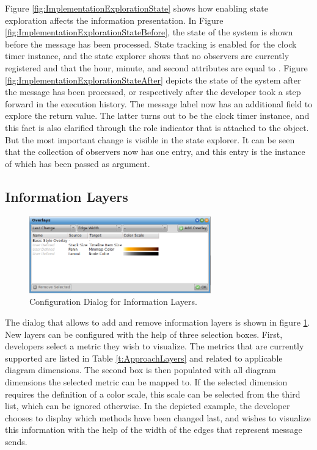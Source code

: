 Figure \ref{fig:ImplementationExplorationState} shows how enabling state exploration affects the information presentation.
In Figure \ref{fig:ImplementationExplorationStateBefore}, the state of the system is shown before the  message has been processed.
State tracking is enabled for the clock timer instance, and the state explorer shows that no observers are currently registered and that the hour, minute, and second attributes are equal to .
Figure \ref{fig:ImplementationExplorationStateAfter} depicts the state of the system after the  message has been processed, or respectively after the developer took a step forward in the execution history.
The message label now has an additional field to explore the return value.
The latter turns out to be the clock timer instance, and this fact is also clarified through the role indicator that is attached to the object.
But the most important change is visible in the state explorer.
It can be seen that the collection of observers now has one entry, and this entry is the instance of  which has been passed as argument.

\subsection{Information Layers}

\begin{figure}[tb]
	\centering
	\includegraphics[width=0.7\textwidth]{../images/04-ImplOverlays}
	\caption{Configuration Dialog for Information Layers.}
	\label{fig:ImplementationLayers}
\end{figure}

The dialog that allows to add and remove information layers is shown in figure \ref{fig:ImplementationLayers}.
New layers can be configured with the help of three selection boxes.
First, developers select a metric they wish to visualize. 
The metrics that are currently supported are listed in Table \ref{t:ApproachLayers}  and related to applicable diagram dimensions.
The second box is then populated with all diagram dimensions the selected metric can be mapped to.
If the selected dimension requires the definition of a color scale, this scale can be selected from the third list, which can be ignored otherwise.
In the depicted example, the developer chooses to display which methods have been changed last, and wishes to visualize this information with the help of the width of the edges that represent message sends.

